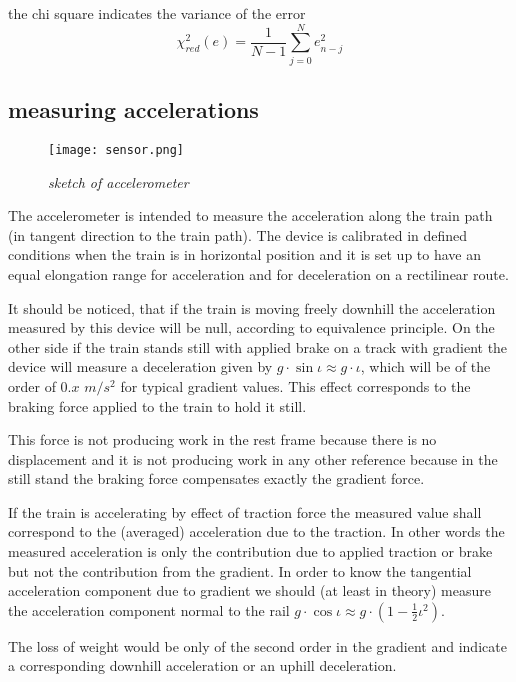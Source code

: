 the chi square indicates the variance of the error
\begin{equation}
\chi^2_{red}(e)=\frac{1}{N-1}\sum\limits_{j=0}^{N}e^2_{n-j}
\end{equation}

\subsection{measuring accelerations }
\begin{figure}[!ht]
\centerline{
\texttt{[image: sensor.png]}
}
\caption{\emph{sketch of accelerometer}}
\label{fig:sensor}
\end{figure}
The accelerometer is intended to measure the acceleration along the train path (in tangent direction to the train path). The device  is calibrated in defined conditions when the train is in horizontal position and it is set up to have an equal elongation range for acceleration and for deceleration on a rectilinear route. 

It should be noticed, that if the train is moving freely downhill the acceleration measured by this device will be null, according to equivalence principle. On the other side if the train stands still with applied brake on a track with gradient the device will measure a deceleration given by $g\cdot\sin\iota\approx g\cdot\iota $, which will be of the order of $0.x \,\, m/s^2$ for typical gradient values. This effect corresponds to the braking force applied to the train to hold it still. 

This force is not producing work in the rest frame because there is no displacement and it is not producing work in any other reference because in the still stand the braking force compensates exactly the gradient force. 

If the train is accelerating by effect of traction force the measured value shall correspond to the (averaged) acceleration due to the traction. 
In other words the measured acceleration is only the contribution due to applied traction or brake but not the contribution from the gradient. In order to know the tangential acceleration component due to gradient we should (at least in theory) measure the acceleration component normal to the rail $g\cdot\cos\iota \approx g\cdot \left(1-\frac{1}{2}\iota^2 \right) $. 

The loss of weight would be only of the second order in the gradient and indicate a corresponding downhill acceleration or an uphill deceleration.
